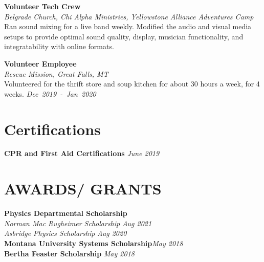 \documentclass[margin]{res}
\begin{document}
\begin{resume}
\noindent
\raggedright
\textbf{Volunteer Tech Crew}\\
{\sl Belgrade Church, Chi Alpha Ministries, Yellowstone Alliance Adventures Camp}\\\vspace{0.5ex}
Ran sound mixing for a live band weekly. Modified the audio and visual media setups to provide optimal sound quality, display, musician functionality, and integratability with online formats.\\

\noindent
\raggedright
\textbf{Volunteer Employee}\\
{\sl Rescue Mission, Great Falls, MT}\\\vspace{0.5ex}
Volunteered for the thrift store and soup kitchen for about 30 hours a week, for 4 weeks. \hfill
{\sl Dec~2019~-~Jan~2020}

\section{Certifications}
\raggedright
\textbf{CPR and First Aid Certifications} \hfill {\sl June 2019}

\section{AWARDS/ GRANTS}
\raggedright
\textbf{Physics Departmental Scholarship}\\
\hspace{3ex} {\sl Norman Mac Rugheimer Scholarship} \hfill {\sl Aug 2021}\\\vspace{0.5ex}
\hspace{3ex} {\sl Asbridge Physics Scholarship} \hfill {\sl Aug 2020}\\\vspace{0.5ex}
\textbf{Montana University Systems Scholarship}\hfill\hfil {\sl May 2018}\\\vspace{0.5ex}
\textbf{Bertha Feaster Scholarship} \hfill {\sl May 2018}


\end{resume}
\end{document}
